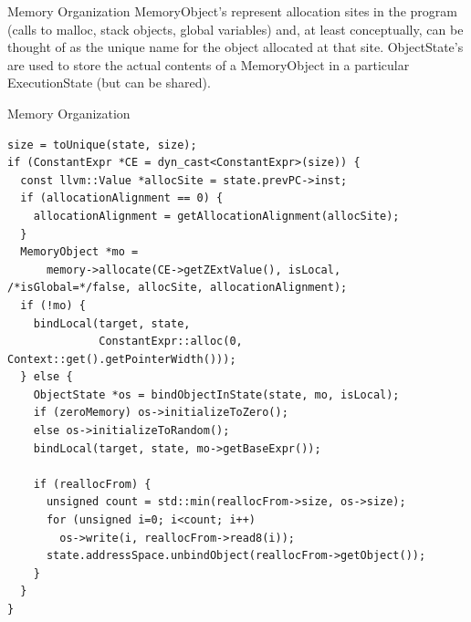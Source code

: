 \documentclass[9pt,aspectratio=43,mathserif,table]{beamer}
\begin{document}
\begin{frame}{Memory Organization}
	MemoryObject's represent allocation sites in the program (calls to malloc, stack objects, global variables) and,
	at least conceptually, can be thought of as the unique name for the object allocated at that site.
	ObjectState's are used to store the actual contents of a MemoryObject in a particular ExecutionState (but can be shared).
\end{frame}
\begin{frame}[fragile]{Memory Organization}
	\begin{lstlisting}
size = toUnique(state, size);
if (ConstantExpr *CE = dyn_cast<ConstantExpr>(size)) {
  const llvm::Value *allocSite = state.prevPC->inst;
  if (allocationAlignment == 0) {
    allocationAlignment = getAllocationAlignment(allocSite);
  }
  MemoryObject *mo =
      memory->allocate(CE->getZExtValue(), isLocal, /*isGlobal=*/false, allocSite, allocationAlignment);
  if (!mo) {
    bindLocal(target, state, 
              ConstantExpr::alloc(0, Context::get().getPointerWidth()));
  } else {
    ObjectState *os = bindObjectInState(state, mo, isLocal);
    if (zeroMemory) os->initializeToZero();
    else os->initializeToRandom();
    bindLocal(target, state, mo->getBaseExpr());
    
    if (reallocFrom) {
      unsigned count = std::min(reallocFrom->size, os->size);
      for (unsigned i=0; i<count; i++)
        os->write(i, reallocFrom->read8(i));
      state.addressSpace.unbindObject(reallocFrom->getObject());
    }
  }
}
      \end{lstlisting}
\end{frame}
\end{document}
